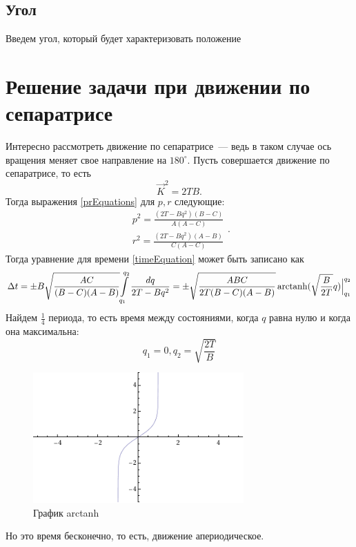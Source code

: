 \documentclass{article}
\DeclareMathOperator\arctanh{arctanh}
\newcommand{\degree}{^{\circ}}
\begin{document}
\subsection{Угол}
Введем угол, который будет характеризовать положение 

\section{Решение задачи при движении по сепаратрисе}
Интересно рассмотреть движение по сепаратрисе~--- ведь в таком случае ось вращения меняет свое направление на \begin{math}180\degree\end{math}.
Пусть совершается движение по сепаратрисе, то есть
\begin{equation}
\vec{K}^2=2TB.
\end{equation}
Тогда выражения \ref{prEquations} для \begin{math} p, r \end{math} следующие:
\begin{equation}
\begin{array}{l}
p^2=\frac{(2T-Bq^2)(B-C)}{A(A-C)}\\
r^2=\frac{(2T-Bq^2)(A-B)}{C(A-C)}
\end{array}.
\end{equation}
Тогда уравнение для времени \ref{timeEquation} может быть записано как
\begin{equation}
\Delta t=\pm B\sqrt{\frac{AC}{(B-C)(A-B)}}{\int\limits_{q_1}^{q_2}\frac{dq}{2T-Bq^2}}=
\pm\sqrt{\frac{ABC}{2T(B-C)(A-B)}}\arctanh(\sqrt{\frac{B}{2T}}q)\Bigl|_{q_1}^{q_2}
\end{equation}
Найдем \begin{math} \frac{1}{4} \end{math} периода, то есть время между состояниями, когда \begin{math} q \end{math} равна нулю и когда она максимальна:
\begin{equation}
q_1=0, q_2=\sqrt{\frac{2T}{B}}
\end{equation}
\begin{figure}[h]
\includegraphics[height=5cm]{ArcTanh}
\caption{График arctanh}
\end{figure}
Но это время бесконечно, то есть, движение апериодическое.
\end{document}
